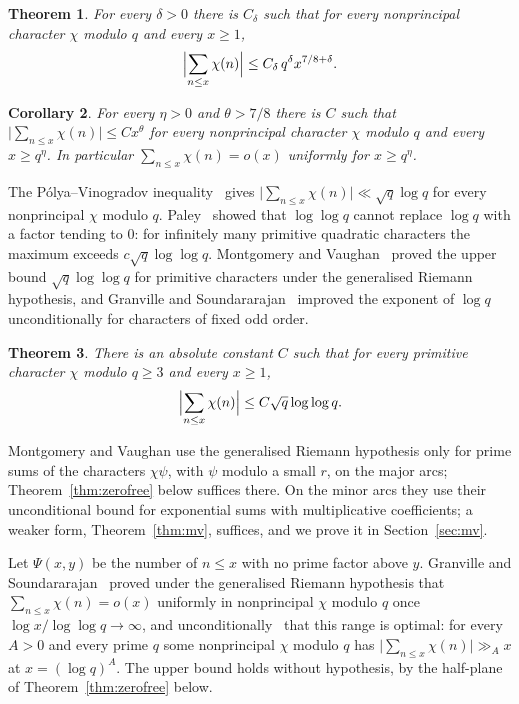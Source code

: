\documentclass[12pt]{amsart}
\newtheorem{theorem}{Theorem}[section]
\newtheorem{corollary}[theorem]{Corollary}
\theoremstyle{remark}
\begin{document}
\begin{theorem}\label{thm:charsum}
For every $\delta>0$ there is $C_\delta$ such that for every nonprincipal character $\chi$ modulo
$q$ and every $x\ge1$,
\[
  \Bigl|\sum_{n\le x}\chi(n)\Bigr|\le C_\delta\,q^\delta x^{7/8+\delta}.
\]
\end{theorem}

\begin{corollary}\label{cor:charsum}
For every $\eta>0$ and $\theta>7/8$ there is $C$ such that $\bigl|\sum_{n\le x}\chi(n)\bigr|\le
Cx^\theta$ for every nonprincipal character $\chi$ modulo $q$ and every $x\ge q^\eta$. In
particular $\sum_{n\le x}\chi(n)=o(x)$ uniformly for $x\ge q^\eta$.
\end{corollary}

The P\'olya--Vinogradov inequality~\cite[Ch.~23]{Dav00} gives
$\bigl|\sum_{n\le x}\chi(n)\bigr|\ll\sqrt q\log q$ for every nonprincipal $\chi$ modulo $q$. Paley~\cite{Pal32}
showed that $\log\log q$ cannot replace $\log q$ with a factor tending to $0$: for infinitely many
primitive quadratic characters the maximum exceeds $c\sqrt q\log\log q$. Montgomery and
Vaughan~\cite{MV77} proved the upper bound $\sqrt q\log\log q$ for primitive characters under the
generalised Riemann hypothesis, and Granville and Soundararajan~\cite{GS07} improved the
exponent of $\log q$ unconditionally for characters of fixed odd order.

\begin{theorem}\label{thm:pv}
There is an absolute constant $C$ such that for every primitive character $\chi$ modulo $q\ge3$
and every $x\ge1$,
\[
  \Bigl|\sum_{n\le x}\chi(n)\Bigr|\le C\sqrt q\log\log q.
\]
\end{theorem}

Montgomery and Vaughan use the generalised Riemann hypothesis only for prime sums of the
characters $\chi\psi$, with $\psi$ modulo a small $r$, on the major arcs; Theorem~\ref{thm:zerofree}
below suffices there. On the minor arcs they use their unconditional bound for exponential sums
with multiplicative coefficients; a weaker form, Theorem~\ref{thm:mv}, suffices, and we prove it
in Section~\ref{sec:mv}.

Let $\Psi(x,y)$ be the number of $n\le x$ with no prime factor above $y$. Granville and
Soundararajan~\cite[Cor.~A, Thm.~2]{GS01} proved under the generalised Riemann hypothesis that
$\sum_{n\le x}\chi(n)=o(x)$ uniformly in nonprincipal $\chi$ modulo $q$ once $\log x/\log\log
q\to\infty$, and unconditionally~\cite[Thm.~3]{GS01} that this range is optimal: for every $A>0$
and every prime $q$ some nonprincipal $\chi$ modulo $q$ has $\bigl|\sum_{n\le x}\chi(n)\bigr|\gg_A x$
at $x=(\log q)^A$. The upper bound holds without hypothesis, by the half-plane of
Theorem~\ref{thm:zerofree} below.
\end{document}
